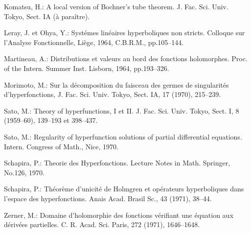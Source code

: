 \begin{thebibliography}{20}
    Komatsu, H.: 
    A local version of Bochner’s tube theorem. 
    J. Fac. Sci. Univ. Tokyo, Sect. IA (\`a para\^itre).

    Leray, J. et Ohya, Y.: 
    Syst\'emes lin\'eaires hyperboliques non stricts. 
    Colloque sur l’Analyse Fonctionnelle, 
    Li\`ege, 1964, C.B.R.M., pp.105--144.

    Martineau, A.: 
    Distributions et valeurs au bord des fonctions holomorphes. 
    Proc. of the Intern. Summer Inst. Lisborn, 1964, pp.193--326.

    Morimoto, M.: 
    Sur la d\'ecomposition du faisceau des germes 
    de singularit\'es d’hyperfonctions, 
    J. Fac. Sci. Univ. Tokyo, Sect. IA, 17 (1970), 215--239.

    Sato, M.: 
    Theory of hyperfunctions, I et II. 
    J. Fac. Sci. Univ. Tokyo, Sect. I, 8 (1959–60), 
    139--193 et 398--437.

    Sato, M.: 
    Regularity of hyperfunction solutions 
    of partial differential equations. 
    Intern. Congress of Math., Nice, 1970.

    Schapira, P.: 
    Theorie des Hyperfonctions. 
    Lecture Notes in Math. Springer, No.126, 1970.

    Schapira, P.: 
    Th\'eor\`eme d’unicit\'e de Holmgren et op\'erateurs 
    hyperboliques dans l’espace des hyperfonctions. 
    Anais Acad. Brasil Sc., 43 (1971), 38--44.

    Zerner, M.: 
    Domaine d’holomorphie des fonctions v\'erifiant 
    une \'equation aux d\'eriv\'ees partielles. 
    C. R. Acad. Sci. Paris, 272 (1971), 1646--1648.
\end{thebibliography}




